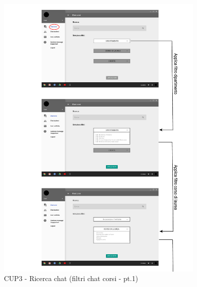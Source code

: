 \begin{figure}
	\centering
	\includegraphics[width=0.9\textwidth]{imgs/gruppo6/activities/act_cup3_filtro_chat_corsi1.pdf}
	\caption{CUP3 - Ricerca chat (filtri chat corsi - pt.1)}
	\label{fig:act-cup3}
\end{figure}

